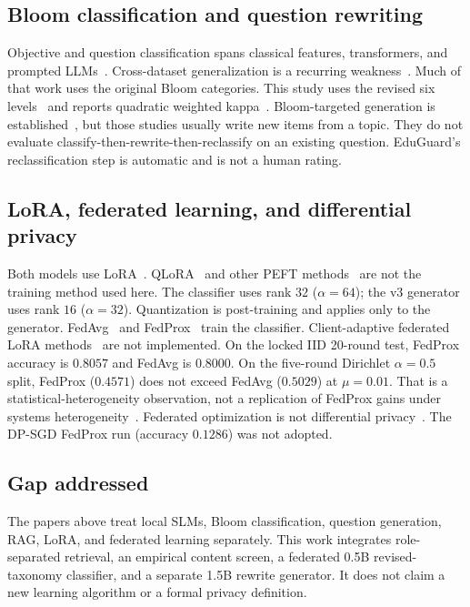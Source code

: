 \documentclass[review,12pt]{elsarticle}
\begin{document}
\subsection{Bloom classification and question rewriting}
Objective and question classification spans classical features, transformers, and prompted LLMs~\cite{li2022objectives,mohammed2020tfidf,waheed2021bloomnet,bloomanalysis2025,crossbloom2026,abduljabbar2015bloom}.
Cross-dataset generalization is a recurring weakness~\cite{waheed2021bloomnet,crossbloom2026}.
Much of that work uses the original Bloom categories.
This study uses the revised six levels~\cite{bloom1956taxonomy,anderson2001revision} and reports quadratic weighted kappa~\cite{cohen1968weighted}.
Bloom-targeted generation is established~\cite{teachers2024quizzes,bea2024questions,qgen2024strategies,gpt4answers2024}, but those studies usually write new items from a topic.
They do not evaluate classify-then-rewrite-then-reclassify on an existing question.
EduGuard's reclassification step is automatic and is not a human rating.

\subsection{LoRA, federated learning, and differential privacy}
Both models use LoRA~\cite{hu2022lora}.
QLoRA~\cite{dettmers2023qlora,teachinglora,spamqlora2026} and other PEFT methods~\cite{sktuning2024} are not the training method used here.
The classifier uses rank $32$ ($\alpha{=}64$); the v3 generator uses rank $16$ ($\alpha{=}32$).
Quantization is post-training and applies only to the generator.
FedAvg~\cite{mcmahan2017fedavg,konecny2016comm} and FedProx~\cite{li2020fedprox} train the classifier.
Client-adaptive federated LoRA methods~\cite{flexlora2024,lorafair2024} are not implemented.
On the locked IID 20-round test, FedProx accuracy is $0.8057$ and FedAvg is $0.8000$.
On the five-round Dirichlet $\alpha{=}0.5$ split, FedProx ($0.4571$) does not exceed FedAvg ($0.5029$) at $\mu{=}0.01$.
That is a statistical-heterogeneity observation, not a replication of FedProx gains under systems heterogeneity~\cite{li2020fedprox}.
Federated optimization is not differential privacy~\cite{alrubaie2018privacy,kairouz2021advances,abadi2016dpsgd}.
The DP-SGD FedProx run (accuracy $0.1286$) was not adopted.

\subsection{Gap addressed}
The papers above treat local SLMs, Bloom classification, question generation, RAG, LoRA, and federated learning separately.
This work integrates role-separated retrieval, an empirical content screen, a federated 0.5B revised-taxonomy classifier, and a separate 1.5B rewrite generator.
It does not claim a new learning algorithm or a formal privacy definition.
\end{document}
